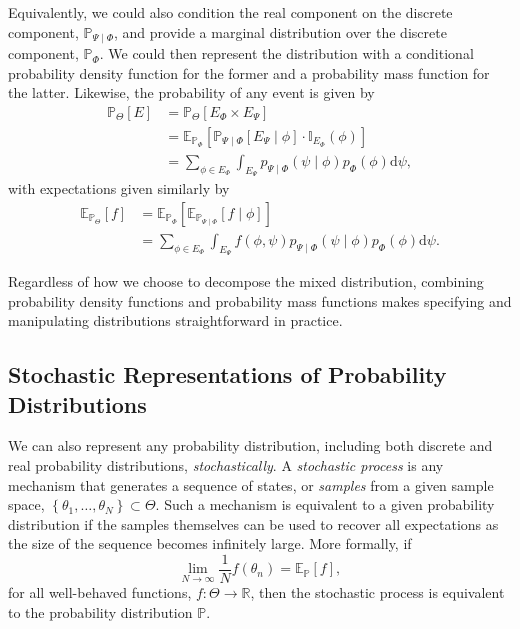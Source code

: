 \documentclass[11pt, oneside]{article}
\newcommand{\dd}{ \mathrm{d} }
\newcommand{\PP}{ \mathbb{P} }
\newcommand{\EE}{ \mathbb{E} }
\newcommand{\RR}{ \mathbb{R} }
\begin{document}
Equivalently, we could also condition the real component on the
discrete component, $\PP_{\Psi \mid \Phi}$, and provide a marginal 
distribution over the discrete component, $\PP_{\Phi}$.  We could 
then represent the distribution with a conditional probability density 
function for the former and a probability mass function for the latter.  
Likewise, the probability of any event is given by
%
\begin{align*}
\PP_{\Theta} \! \left[ E \right]
&=
\PP_{\Theta} \! \left[ E_{\Phi} \times E_{\Psi} \right]
\\
&=
\EE_{\PP_{\Phi}} \! \left[
\PP_{\Psi \mid \Phi} \! \left[  E_{\Psi} \mid \phi \right]
\cdot
\mathbb{I}_{E_{\Phi}} \! \left( \phi \right)
\right] 
\\
&= 
\sum_{\phi \in E_{\Phi} } \int_{E_{\Psi} }
p_{\Psi \mid \Phi} \! \left( \psi \mid \phi \right) 
p_{\Phi} \! \left( \phi \right) \dd \psi,
\end{align*}
%
with expectations given similarly by
%
\begin{align*}
\EE_{\PP_{\Theta}} \! \left[ f \right]
&=
\EE_{\PP_{\Phi}} \! \left[
\EE_{\PP_{\Psi \mid \Phi}} \! \left[  f \mid \phi \right]
\right] 
\\
&= 
\sum_{\phi \in E_{\Phi} } \int_{E_{\Psi} }
f \! \left( \phi, \psi \right) 
p_{\Psi \mid \Phi} \! \left( \psi \mid \phi \right)
p_{\Phi} \! \left( \phi \right) \dd \psi.
\end{align*}

Regardless of how we choose to decompose the mixed distribution,
combining probability density functions and probability mass functions
makes specifying and manipulating distributions straightforward in
practice.

\subsection{Stochastic Representations of Probability Distributions}

We can also represent any probability distribution, including both
discrete and real probability distributions, \emph{stochastically}.  
A \emph{stochastic process} is any mechanism that generates a 
sequence of states, or \emph{samples} from a given sample space, 
$\left\{ \theta_{1}, \ldots, \theta_{N} \right\} \subset \Theta$.  Such a 
mechanism is equivalent to a given probability distribution if the 
samples themselves can be used to recover all expectations as 
the size of the sequence becomes infinitely large. More formally, 
if
%
\begin{equation*}
\lim_{N \rightarrow \infty} \frac{1}{N} f \! \left( \theta_{n} \right)
= \EE_{\PP} \! \left[ f \right],
\end{equation*}
%
for all well-behaved functions, $f : \Theta \rightarrow \RR$, then the 
stochastic process is equivalent to the probability distribution $\PP$.
\end{document}
